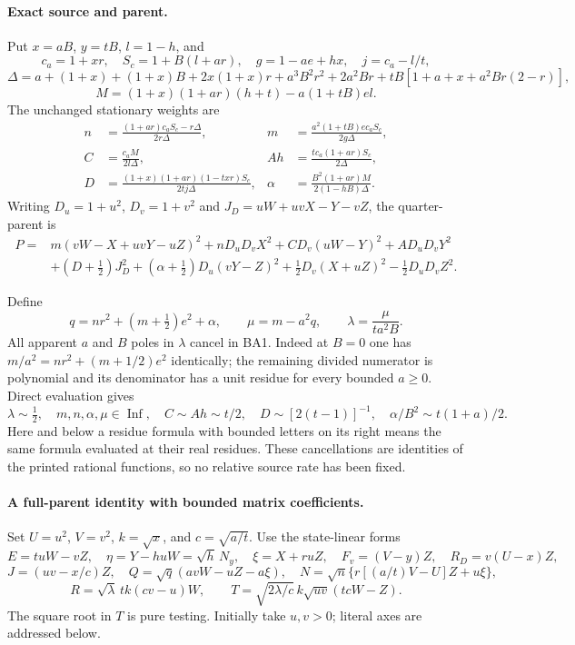\paragraph{Exact source and parent.}
Put $x=aB$, $y=tB$, $l=1-h$, and
\[
 c_a=1+xr,\quad S_c=1+B(l+ar),\quad g=1-ae+hx,\quad
 j=c_a-l/t,
\]
\[
 \Delta=a+(1+x)+(1+x)B+2x(1+x)r+a^3B^2r^2+2a^2Br
             +tB[1+a+x+a^2Br(2-r)],
\]
\[
 M=(1+x)(1+ar)(h+t)-a(1+tB)el.
\]
The unchanged stationary weights are
\[
 \begin{aligned}
 n&=\frac{(1+ar)c_aS_c-r\Delta}{2r\Delta},&
 m&=\frac{a^2(1+tB)e c_aS_c}{2g\Delta},\\
 C&=\frac{c_aM}{2l\Delta},&
 Ah&=\frac{t c_a(1+ar)S_c}{2\Delta},\\
 D&=\frac{(1+x)(1+ar)(1-txr)S_c}{2tj\Delta},&
 \alpha&=\frac{B^2(1+ar)M}{2(1-hB)\Delta}.
 \end{aligned}                                                     \tag{BA1}
\]
Writing $D_u=1+u^2$, $D_v=1+v^2$ and
$J_D=uW+uvX-Y-vZ$, the quarter-parent is
\[
 \begin{split}
 P={}&m(vW-X+uvY-uZ)^2+nD_uD_vX^2+CD_v(uW-Y)^2
       +AD_uD_vY^2\\
    &+(D+\tfrac12)J_D^2+(\alpha+\tfrac12)D_u(vY-Z)^2
      +\tfrac12D_v(X+uZ)^2-\tfrac12D_uD_vZ^2.
 \end{split}                                                       \tag{BA2}
\]

Define
\[
 q=nr^2+(m+\tfrac12)e^2+\alpha,\qquad
 \mu=m-a^2q,\qquad \lambda=\frac{\mu}{ta^2B}.
\]
All apparent $a$ and $B$ poles in $\lambda$ cancel in BA1.
Indeed at $B=0$ one has
$m/a^2=nr^2+(m+1/2)e^2$ identically; the remaining divided
numerator is polynomial and its denominator has a unit residue
for every bounded $a\ge0$. Direct evaluation gives
\[
 \lambda\sim\tfrac12,\quad m,n,\alpha,\mu\in\operatorname{Inf},
 \quad C\sim Ah\sim t/2,\quad D\sim[2(t-1)]^{-1},
 \quad \alpha/B^2\sim t(1+a)/2.                           \tag{BA3}
\]
Here and below a residue formula with bounded letters on its right
means the same formula evaluated at their real residues.
These cancellations are identities of the printed rational functions,
so no relative source rate has been fixed.

\paragraph{A full-parent identity with bounded matrix coefficients.}
Set $U=u^2$, $V=v^2$, $k=\sqrt{x}$, and $c=\sqrt{a/t}$.
Use the state-linear forms
\[
 E=tuW-vZ,\quad \eta=Y-huW=\sqrt h\,N_y,\quad
 \xi=X+ruZ,\quad F_v=(V-y)Z,\quad R_D=v(U-x)Z,
\]
\[
 J=(uv-x/c)Z,\quad Q=\sqrt q(avW-uZ-a\xi),\quad
 N=\sqrt n\{r[(a/t)V-U]Z+u\xi\},
\]
\[
 R=\sqrt\lambda\,tk(cv-u)W,\qquad
 T=\sqrt{2\lambda/c}\,k\sqrt{uv}(tcW-Z).              \tag{BA4}
\]
The square root in $T$ is pure testing. Initially take $u,v>0$;
literal axes are addressed below.

